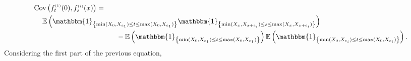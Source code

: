 \documentclass[12pt]{article}
\theoremstyle{Theorem}
\begin{document}
{\small
\begin{align}
\label{covconf}
\text{Cov}\left(f_{t}^{\scriptscriptstyle (1)}(0), f_{s}^{ \scriptscriptstyle (i)}(x)\right) & = \nonumber \\
& \hspace{-2.7cm} \mathbb{E}\left(\mathbbm{1}_{\left\{\min(X_{\scriptscriptstyle 0}, X_{e_1}) \leq t \leq \max(X_{\scriptscriptstyle 0}, X_{e_1})\right\}}\mathbbm{1}_{\left\{\min(X_{\scriptscriptstyle x}, X_{x+e_i}) \leq s \leq \max(X_{\scriptscriptstyle x}, X_{x+e_i}) \right\}}\right) \nonumber\\
& \hspace{1cm} - \mathbb{E}\left(\mathbbm{1}_{\left\{\min(X_{\scriptscriptstyle 0}, X_{e_1}) \leq t \leq \max(X_{\scriptscriptstyle 0}, X_{e_1})\right\}}\right)\mathbb{E}\left(\mathbbm{1}_{\left\{\min(X_{\scriptscriptstyle 0}, X_{e_i}) \leq t \leq \max(X_{\scriptscriptstyle 0}, X_{e_i})\right\}}\right).
\end{align}}Considering the first part of the previous equation, 
\end{document}
